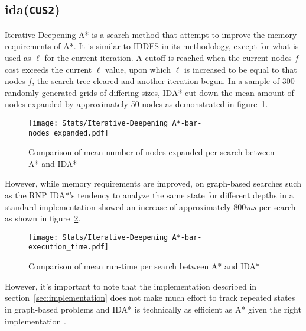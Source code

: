 \subsection{\texorpdfstring{\acrfull{ida}(\texttt{CUS2})}{IDA}} %
\label{sub:texorpdfstring}
Iterative Deepening A* is a search method that attempt to improve the memory requirements of A*. It is similar to IDDFS in its methodology, except for what is used as $\ell$ for the current iteration. A cutoff is reached when the current nodes $f$ cost exceeds the current $\ell$ value, upon which $\ell$ is increased to be equal to that nodes $f$, the search tree cleared and another iteration begun. In a sample of 300 randomly generated grids of differing sizes, IDA* cut down the mean amount of nodes expanded by approximately 50 nodes as demonstrated in figure~\ref{fig:idas_as_expanded}.

\begin{figure}[H]
	\label{fig:idas_as_expanded}
	\centerline{
		\texttt{[image: Stats/Iterative-Deepening A*-bar-nodes\_expanded.pdf]}
	}
	\caption{Comparison of mean number of nodes expanded per search between A* and IDA*}
\end{figure}

However, while memory requirements are improved, on graph-based searches such as the RNP IDA*'s tendency to analyze the same state for different depths in a standard implementation showed an increase of approximately 800\textit{ms} per search as shown in figure~\ref{fig:idas_as_runtime}.

\begin{figure}[H]
	\label{fig:idas_as_runtime}
	\centerline{
		\texttt{[image: Stats/Iterative-Deepening A*-bar-execution\_time.pdf]}
	}
	\caption{Comparison of mean run-time per search between A* and IDA*}
\end{figure}

However, it's important to note that the implementation described in section~\ref{sec:implementation} does not make much effort to track repeated states in graph-based problems and IDA* is technically as efficient as A* given the right implementation \parencite{idas}.


